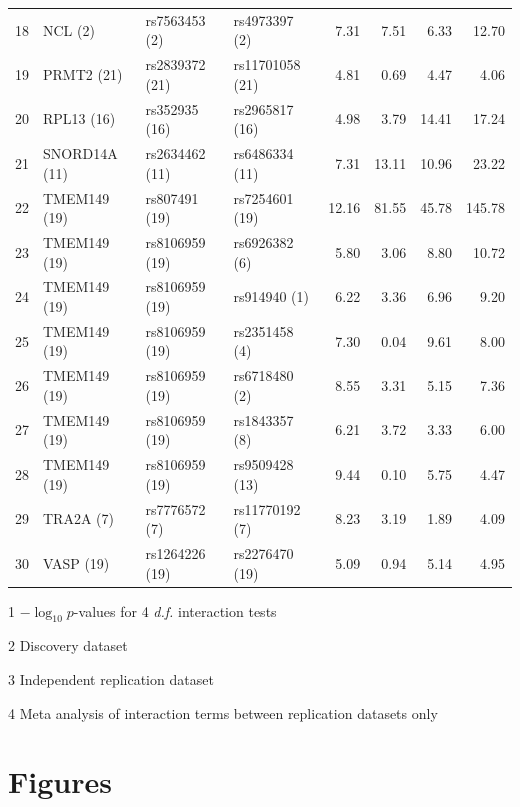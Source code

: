 \documentclass{article}
\begin{document}
\begin{table}[ht]
\begin{threeparttable}
{\begin{tabular}{rlllrrrr}
  18 & NCL (2)  & rs7563453 (2)  & rs4973397 (2)  & 7.31 & 7.51 & 6.33 & 12.70 \\
  19 & PRMT2 (21)  & rs2839372 (21)  & rs11701058 (21)  & 4.81 & 0.69 & 4.47 & 4.06 \\
  20 & RPL13 (16)  & rs352935 (16)  & rs2965817 (16)  & 4.98 & 3.79 & 14.41 & 17.24 \\
  21 & SNORD14A (11)  & rs2634462 (11)  & rs6486334 (11)  & 7.31 & 13.11 & 10.96 & 23.22 \\
  22 & TMEM149 (19)  & rs807491 (19)  & rs7254601 (19)  & 12.16 & 81.55 & 45.78 & 145.78 \\
  23 & TMEM149 (19)  & rs8106959 (19)  & rs6926382 (6)  & 5.80 & 3.06 & 8.80 & 10.72 \\
  24 & TMEM149 (19)  & rs8106959 (19)  & rs914940 (1)  & 6.22 & 3.36 & 6.96 & 9.20 \\
  25 & TMEM149 (19)  & rs8106959 (19)  & rs2351458 (4)  & 7.30 & 0.04 & 9.61 & 8.00 \\
  26 & TMEM149 (19)  & rs8106959 (19)  & rs6718480 (2)  & 8.55 & 3.31 & 5.15 & 7.36 \\
  27 & TMEM149 (19)  & rs8106959 (19)  & rs1843357 (8)  & 6.21 & 3.72 & 3.33 & 6.00 \\
  28 & TMEM149 (19)  & rs8106959 (19)  & rs9509428 (13)  & 9.44 & 0.10 & 5.75 & 4.47 \\
  29 & TRA2A (7)  & rs7776572 (7)  & rs11770192 (7)  & 8.23 & 3.19 & 1.89 & 4.09 \\
  30 & VASP (19)  & rs1264226 (19)  & rs2276470 (19)  & 5.09 & 0.94 & 5.14 & 4.95 \\
   \hline
		\end{tabular}
		}
		\begin{tablenotes}
			\item [1] $-\log_{10} p$-values for 4 \emph{d.f.} interaction tests
			\item [2] Discovery dataset
			\item [3] Independent replication dataset
			\item [4] Meta analysis of interaction terms between replication datasets only
		\end{tablenotes}
	\end{threeparttable}
\end{table}


\clearpage
\section*{Figures}
\end{document}
